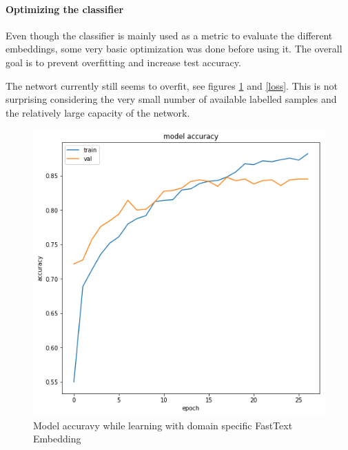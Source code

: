 \documentclass[10pt,a4paper]{article}
\begin{document}
	
	\paragraph{Optimizing the classifier}
	\label{opt_class}
	Even though the classifier is mainly used as a metric to evaluate the different embeddings, some very basic optimization was done before using it. The overall goal is to prevent overfitting and increase test accuracy. 
	
	The networt currently still seems to overfit, see figures \ref{acc} and \ref{loss}. This is not surprising considering the very small number of available labelled samples and the relatively large capacity of the network.
	\begin{figure}
		\begin{center}
			\includegraphics[scale=0.4]{./Pictures/m_acc_ds_ft.png}
			
			\caption{Model accuravy while learning with domain specific FastText Embedding}
			\label{acc}
		\end{center}
	\end{figure}
	
\end{document}
